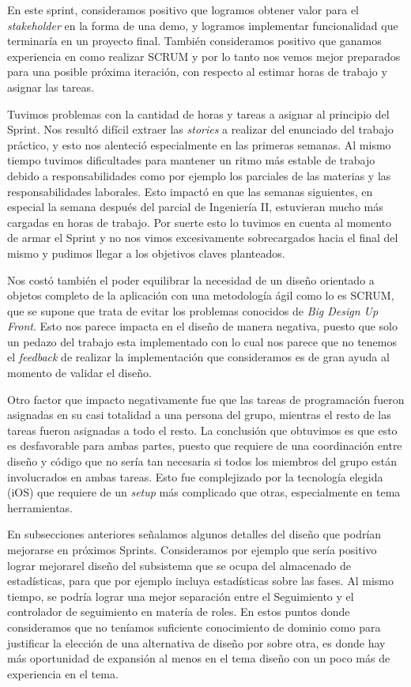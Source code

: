 \documentclass[10pt, a4paper,english,spanish]{article}
\begin{document}
En este sprint, consideramos positivo que logramos obtener valor para el \textit{stakeholder} en la forma de una demo, y logramos implementar funcionalidad que
terminaría en un proyecto final. También consideramos positivo que ganamos experiencia en como realizar SCRUM y por lo tanto nos vemos mejor preparados para una posible próxima iteración, con respecto al estimar horas de trabajo y asignar las tareas.

Tuvimos problemas con la cantidad de horas y tareas a asignar al principio del Sprint. Nos resultó difícil extraer las \textit{stories} a realizar del enunciado del trabajo práctico, y esto nos alenteció especialmente en las primeras semanas. Al mismo tiempo tuvimos dificultades para mantener un ritmo más estable de trabajo debido a responsabilidades como por ejemplo los parciales de las materias y las responsabilidades laborales. Esto impactó en que las semanas siguientes, en especial la semana después del parcial de Ingeniería II, estuvieran mucho más cargadas en horas de trabajo. Por suerte esto lo tuvimos en cuenta al momento de armar el Sprint y no nos vimos excesivamente sobrecargados hacia el final del mismo y pudimos llegar a los objetivos claves planteados.

Nos costó también el poder equilibrar la necesidad de un diseño orientado a objetos completo de la aplicación con una metodología ágil como lo es SCRUM, que se supone que trata de evitar los problemas conocidos de \textit{Big Design Up Front}. Esto nos parece impacta en el diseño de manera negativa, puesto que solo un pedazo del trabajo esta implementado con lo cual nos parece que no tenemos el \textit{feedback} de realizar la implementación que consideramos es de gran ayuda al momento de validar el diseño.

Otro factor que impacto negativamente fue que las tareas de programación fueron asignadas en su casi totalidad a una persona del grupo, mientras el resto de las tareas fueron asignadas a todo el resto. La conclusión que obtuvimos es que esto es desfavorable para ambas partes, puesto que requiere de una coordinación entre diseño y código que no sería tan necesaria si todos los miembros del grupo están involucrados en ambas tareas. Esto fue complejizado por la tecnología elegida (iOS) que requiere de un \textit{setup} más complicado que otras, especialmente en tema herramientas.

En subsecciones anteriores señalamos algunos detalles del diseño que podrían mejorarse en próximos Sprints. Consideramos por ejemplo que sería positivo lograr mejorarel diseño del subsistema que se ocupa del almacenado de estadísticas, para que por ejemplo incluya estadísticas sobre las fases. Al mismo tiempo, se podría lograr una mejor separación entre el Seguimiento y el controlador de seguimiento en matería de roles. En estos puntos donde consideramos que no teníamos suficiente conocimiento de dominio como para justificar la elección de una alternativa de diseño por sobre otra, es donde hay más oportunidad de expansión al menos en el tema diseño con un poco más de experiencia en el tema.
\end{document}
